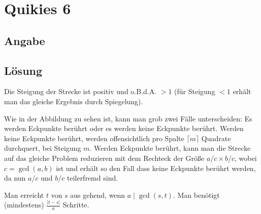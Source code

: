 \section*{Quikies 6}

\subsection*{Angabe}
%

\subsection*{Lösung}
\begin{flushenum}
\item 
\begin{flushalpha}
	\item Die Steigung der Strecke ist positiv und o.B.d.A. $> 1$ (für Steigung $<1$ erhält man das gleiche Ergebnis durch Spiegelung).
	\begin{figure}[h!]
		\begin{center}
		\end{center}
	\end{figure}
	Wie in der Abbildung zu sehen ist, kann man grob zwei Fälle unterscheiden: Es werden Eckpunkte berührt oder es werden keine Eckpunkte berührt.
	Werden keine Eckpunkte berührt, werden offensichtlich pro Spalte $\lceil m \rceil$ Quadrate durchquert, bei Steigung $m$.
	Werden Eckpunkte berührt, kann man die Strecke auf das gleiche Problem reduzieren mit dem Rechteck der Größe $a/c \times b/c$,
	wobei $c = \gcd(a,b)$ ist und erhält so den Fall dass keine Eckpunkte berührt werden, da nun $a/c$ und $b/c$ teilerfremd sind.

	\item Man erreicht $t$ von $s$ aus gehend, wenn $a \mid \gcd(s,t)$. Man benötigt (mindestens) $\frac{|t-s|}{a}$ Schritte.


\end{flushalpha}
\end{flushenum}
